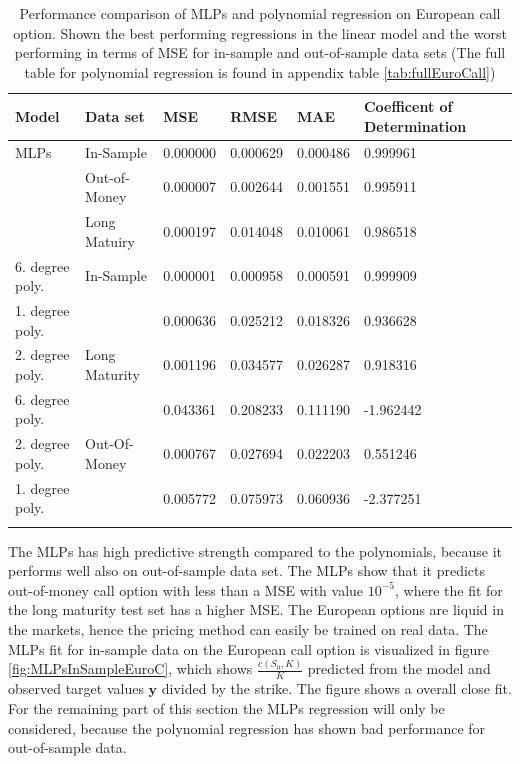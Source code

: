 \begin{table}[th]
\caption{Performance comparison of MLPs and polynomial regression on European call option. Shown the best performing regressions in the linear model and the worst performing in terms of MSE for in-sample and out-of-sample data sets (The full table for polynomial regression is found in appendix table \ref{tab:fullEuroCall})}
\label{tab:ComparePolyWithMLPS}
\centering
\begin{tabular}{l l l l l l l }
\toprule
\textbf{Model} & \textbf{Data set} & \textbf{MSE} & \textbf{RMSE} & \textbf{MAE} & \textbf{Coefficent of Determination} \\
\midrule
MLPs & In-Sample & 0.000000 & 0.000629 & 0.000486 & 0.999961\\
& Out-of-Money & 0.000007 & 0.002644 & 0.001551 & 0.995911\\
& Long Matuiry & 0.000197 & 0.014048 & 0.010061 & 0.986518\\
6. degree poly. & In-Sample & 0.000001 & 0.000958 & 0.000591 & 0.999909\\
1. degree poly. &  & 0.000636 & 0.025212 & 0.018326 & 0.936628\\
2. degree poly. & Long Maturity & 0.001196 & 0.034577 & 0.026287 & 0.918316\\
6. degree poly. &  & 0.043361 & 0.208233 & 0.111190 & -1.962442\\
2. degree poly. & Out-Of-Money & 0.000767 & 0.027694 & 0.022203 & 0.551246\\
1. degree poly. &  & 0.005772 & 0.075973 & 0.060936 & -2.377251\\
\bottomrule\\
\end{tabular}
\end{table}

The MLPs has high predictive strength compared to the polynomials, because it performs well also on out-of-sample data set. The MLPs show that it predicts out-of-money call option with less than a MSE with value $10^{-5}$, where the fit for the long maturity test set has a higher MSE. The European options are liquid in the markets, hence the pricing method can easily be trained on real data. The MLPs fit for in-sample data on the European call option is visualized in figure \ref{fig:MLPsInSampleEuroC}, which shows $\frac{c(S_0,K)}{K}$ predicted from the model and observed target values $\bm{y}$ divided by the strike. The figure shows a overall close fit. For the remaining part of this section the MLPs regression will only be considered, because the polynomial regression has shown bad performance for out-of-sample data.

